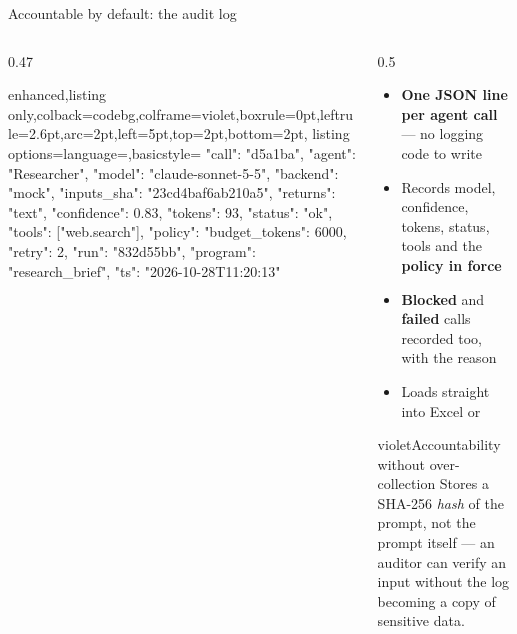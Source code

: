 \documentclass[aspectratio=169,11pt]{beamer}
\begin{document}
\begin{frame}[fragile]{Accountable by default: the audit log}
\begin{columns}[T]
\begin{column}{0.47\textwidth}
\begin{tcblisting}{enhanced,listing only,colback=codebg,colframe=violet,boxrule=0pt,leftrule=2.6pt,arc=2pt,left=5pt,top=2pt,bottom=2pt,
  listing options={language={},basicstyle=\ttfamily\fontsize{6.8}{8}\selectfont}}
{
  "call": "d5a1ba",
  "agent": "Researcher",
  "model": "claude-sonnet-5-5",
  "backend": "mock",
  "inputs_sha": "23cd4baf6ab210a5",
  "returns": "text",
  "confidence": 0.83,
  "tokens": 93,
  "status": "ok",
  "tools": ["web.search"],
  "policy": {"budget_tokens": 6000, "retry": 2},
  "run": "832d55bb",
  "program": "research_brief",
  "ts": "2026-10-28T11:20:13"
}
\end{tcblisting}
\end{column}
\begin{column}{0.5\textwidth}
\begin{itemize}\small
  \item \textbf{One JSON line per agent call} --- no logging code to write
  \item Records model, confidence, tokens, status, tools and the \textbf{policy in force}
  \item \textbf{Blocked} and \textbf{failed} calls recorded too, with the reason
  \item Loads straight into Excel or 
\end{itemize}
\begin{card}{violet}{Accountability without over-collection}
Stores a SHA-256 \emph{hash} of the prompt, not the prompt itself --- an auditor can verify an input without the log becoming a copy of sensitive data.
\end{card}
\end{column}
\end{columns}
\end{frame}
\end{document}
